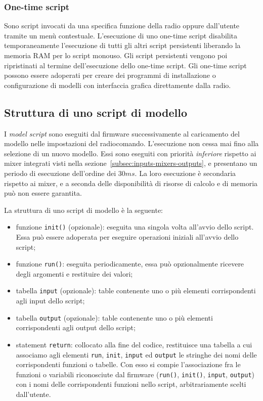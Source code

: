 \documentclass[a4paper, 12pt]{report} %
\begin{document}
\subsubsection{One-time script}
        Sono script invocati da una specifica funzione della radio oppure dall'utente tramite un menù contestuale. L'esecuzione di uno one-time script disabilita temporaneamente l'esecuzione di tutti gli altri script persistenti liberando la memoria RAM per lo script monouso. Gli script persistenti vengono poi ripristinati al termine dell'esecuzione dello one-time script. Gli one-time script possono essere adoperati per creare dei programmi di installazione o configurazione di modelli con interfaccia grafica direttamente dalla radio.

\subsection{Struttura di uno script di modello}\label{subsec:struttura-script-modello}
I \emph{model script} sono eseguiti dal firmware successivamente al caricamento del modello nelle impostazioni del radiocomando. L'esecuzione non cessa mai fino alla selezione di un nuovo modello. Essi sono eseguiti con priorità \emph{inferiore} rispetto ai mixer integrati visti nella sezione~\ref{subsec:inputs-mixers-outputs}, e presentano un periodo di esecuzione dell'ordine dei $30ms$. La loro esecuzione è secondaria rispetto ai mixer, e a seconda delle disponibilità di risorse di calcolo e di memoria può non essere garantita.

La struttura di uno script di modello è la seguente:
\begin{itemize}
        \item funzione \texttt{init()} (opzionale): eseguita una singola volta all'avvio dello script. Essa può essere adoperata per eseguire operazioni iniziali all'avvio dello script;
        \item funzione \texttt{run()}: eseguita periodicamente, essa può opzionalmente ricevere degli argomenti e restituire dei valori;
        \item tabella \texttt{input} (opzionale): table contenente uno o più elementi corrispondenti agli input dello script;
        \item tabella \texttt{output} (opzionale): table contenente uno o più elementi corrispondenti agli output dello script;
        \item statement \texttt{return}: collocato alla fine del codice, restituisce una tabella a cui associamo agli elementi \texttt{run}, \texttt{init}, \texttt{input} ed \texttt{output} le stringhe dei nomi delle corrispondenti funzioni o tabelle. Con esso si compie l'associazione fra le funzioni o variabili riconosciute dal firmware (\texttt{run()}, \texttt{init()}, \texttt{input}, \texttt{output}) con i nomi delle corrispondenti funzioni nello script, arbitrariamente scelti dall'utente.
\end{itemize}
\end{document}
